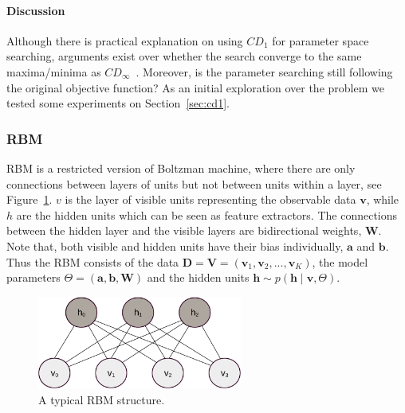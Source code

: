\paragraph{Discussion}
Although there is practical explanation on using $CD_1$ for parameter space searching, arguments exist over whether the search converge to the same maxima/minima as $CD_\infty$~\cite{wu2015bias}.
Moreover, is the parameter searching still following the original objective function?	
As an initial exploration over the problem we tested some experiments on Section~\ref{sec:cd1}. 
\subsubsection{RBM\cite{zhang2013rbm}}
RBM is a restricted version of Boltzman machine, where there are only connections between layers of units but not between units within a layer, see Figure~\ref{fig:RBM}.
$ v $ is the layer of visible units representing the observable data $ \mathbf{v} $, while $ h $ are the hidden units which can be seen as feature extractors.
The connections between the hidden layer and the visible layers are bidirectional weights, $ \mathbf{W} $.
Note that, both visible and hidden units have their bias individually, $ \mathbf{a} $ and $ \mathbf{b} $.
Thus the RBM consists of the data $ \mathbf{D} = \mathbf{V} = (\mathbf{v}_1, \mathbf{v}_2, ..., \mathbf{v}_K ) $, the model parameters $ \Theta = (\mathbf{a}, \mathbf{b}, \mathbf{W}) $ and the hidden units $ \mathbf{h} \sim p(\mathbf{h} \mid \mathbf{v}, \Theta) $.
\begin{figure}[hbt]
	\centering
	\includegraphics[width=0.6\textwidth]{pics_sdbn/RBM.pdf}
	\caption{A typical RBM structure.}
	\label{fig:RBM}
\end{figure}

